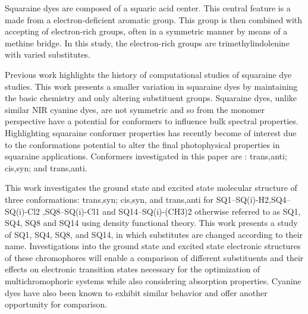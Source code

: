 \documentclass[journal=jacsat,manuscript=article]{achemso}
\begin{document}
Squaraine dyes are composed of a squaric acid center. This central feature is a made from a electron-deficient aromatic group. This group is then combined with accepting of electron-rich groups, often in a symmetric manner by means of a methine bridge\cite{Ilina2020SquaraineChallenges}⁠. In this study, the electron-rich groups are trimethylindolenine with varied substitutes.

Previous work\cite{Bassal2017ExploringADC2}⁠ highlights the history of computational studies of squaraine dye studies. This work presents a smaller variation in squaraine dyes by maintaining the basic chemistry and only altering substituent groups. Squaraine dyes, unlike similar NIR cyanine dyes, are not symmetric and so from the monomer perspective have a potential for conformers to influence bulk spectral properties\cite{Kolosova2018MolecularSquaraines}⁠. Highlighting squaraine conformer properties has recently become of interest due to the conformations potential to alter the final photophysical properties in squaraine applications\cite{Paterno2018ExcitedScenario}⁠.  Conformers investigated in this paper are : trans,anti; cis,syn; and trans,anti.

This work investigates the ground state and excited state molecular structure of three conformations: trans,syn; cis,syn, and trans,anti for SQ1--SQ(i)-H2,SQ4--SQ(i)-Cl2 ,SQ8--SQ(i)-Cl1 and SQ14--SQ(i)-(CH3)2 otherwise referred to as SQ1, SQ4, SQ8 and SQ14 using density functional theory. This work presents a study of SQ1, SQ4, SQ8, and SQ14, in which substitutes are changed according to their name. Investigations into the ground state and excited state electronic structures of these chromophores will enable a comparison of different substituents and their effects on electronic transition states necessary for the optimization of multichromophoric systems while also considering absorption properties. Cyanine dyes have also been known to exhibit similar behavior and offer another opportunity for comparison\cite{Fothergill2018AbDyes}.


\end{document}
